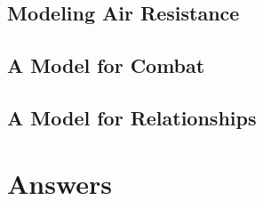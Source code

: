 \documentclass{amsbook}
\begin{document}
    \section{Modeling Air Resistance}
    
    \section{A Model for Combat}
    
    \section{A Model for Relationships}
    


\chapter{Answers}
\shipoutAnswer

\printbibliography
\end{document}
